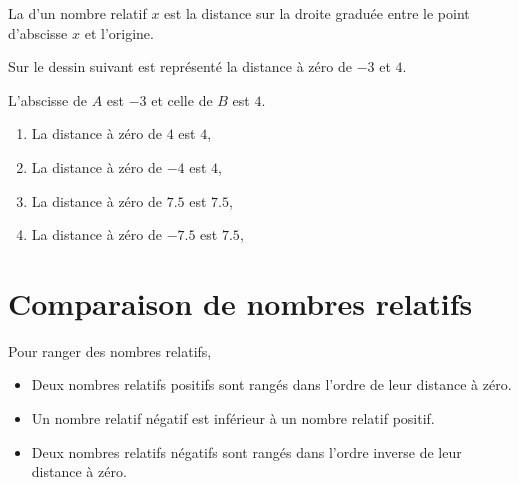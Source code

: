 \begin{definition}
    La  d'un nombre relatif \( x\) est la distance sur la droite graduée entre le point d'abscisse \( x\) et l'origine.
\end{definition}

\begin{example}
    Sur le dessin suivant est représenté la distance à zéro de \( -3\) et \( 4\).
    \begin{center}
        
    \end{center}
    L'abscisse de \( A\) est \( -3\) et celle de \( B\) est \( 4\).
\end{example}

\begin{example}
    \begin{enumerate}
        \item
            La distance à zéro de \( 4\) est \( 4\),
        \item
            La distance à zéro de \( -4\) est \( 4\),
        \item
            La distance à zéro de \( 7.5\) est \( 7.5\),
        \item
            La distance à zéro de \( -7.5 \) est \( 7.5\),
    \end{enumerate}
\end{example}

\section{Comparaison de nombres relatifs}



\begin{Aretenir}
    
    Pour ranger des nombres relatifs,

    \begin{itemize}
        \item 
Deux nombres relatifs positifs sont rangés dans l'ordre de leur distance à zéro.  
\item
Un nombre relatif négatif est inférieur à un nombre relatif positif. 
\item
Deux nombres relatifs négatifs sont rangés dans l'ordre inverse de leur distance à zéro.
    \end{itemize}
\end{Aretenir}


